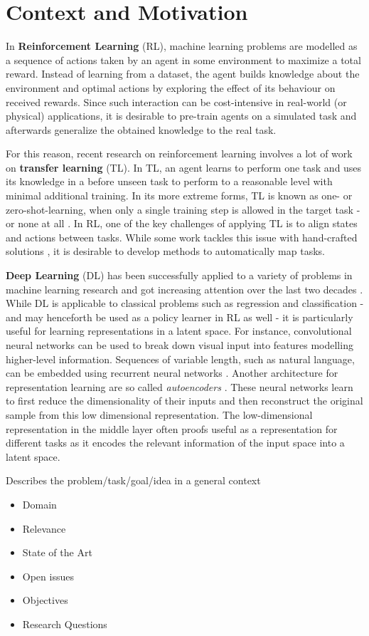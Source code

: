 \section{Context and Motivation}
\label{sec:context}

In \textbf{Reinforcement Learning} (RL), machine learning problems are modelled as a sequence of actions taken by an agent in some environment to maximize a total reward. Instead of learning from a dataset, the agent builds knowledge about the environment and optimal actions by exploring the effect of its behaviour on received rewards. Since such interaction can be cost-intensive in real-world (or physical) applications, it is desirable to pre-train agents on a simulated task and afterwards generalize the obtained knowledge to the real task. 

For this reason, recent research on reinforcement learning involves a lot of work on \textbf{transfer learning} (TL). In TL, an agent learns to perform one task and uses its knowledge in a before unseen task to perform to a reasonable level with minimal additional training. In its more extreme forms, TL is known as one- or zero-shot-learning, when only a single training step is allowed in the target task - or none at all \citep{goodfellow2016deep}. In RL, one of the key challenges of applying TL is to align states and actions between tasks. While some work tackles this issue with hand-crafted solutions \citep[e.g.][]{taylor2007cross}, it is desirable to develop methods to automatically map tasks.


\textbf{Deep Learning} (DL) has been successfully applied to a variety of problems in machine learning research and got increasing attention over the last two decades \citep{goodfellow2016deep}. While DL is applicable to classical problems such as regression and classification - and may henceforth be used as a policy learner in RL as well - it is particularly useful for learning representations in a latent space. For instance, convolutional neural networks can be used to break down visual input into features modelling higher-level information. Sequences of variable length, such as natural language, can be embedded using recurrent neural networks \citep{goldberg2017neural}. Another architecture for representation learning are so called \textit{autoencoders} \citep{hinton2006reducing}. These neural networks learn to first reduce the dimensionality of their inputs and then reconstruct the original sample from this low dimensional representation. The low-dimensional representation in the middle layer often proofs useful as a representation for different tasks as it encodes the relevant information of the input space into a latent space.


\hrulefill

Describes the problem/task/goal/idea in a general context

\begin{itemize}
\item Domain
\item Relevance
\item State of the Art
\item Open issues
\item Objectives
\item Research Questions
\end{itemize}